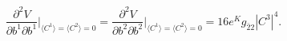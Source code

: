 \begin{equation}
\frac{\partial^2 V}{\partial b^1 \partial b^1} \Big|_{     \langle
C^1 \rangle =  \langle C^2 \rangle  =0} =\frac{\partial^2
V}{\partial b^2 \partial b^2} \Big|_{     \langle C^1 \rangle =
\langle C^2 \rangle  =0} = 16e^Kg_{\bar{2}2} |C^3|^4.
\end{equation}


